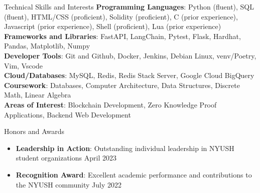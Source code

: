 \documentclass{resume} %
\begin{document}
\begin{rSection}{Technical Skills and Interests}
	\textbf{Programming Languages}{: Python (fluent), SQL (fluent), HTML/CSS (proficient), Solidity (proficient), C (prior experience),  Javascript (prior experience), Shell  (proficient), Lua (prior experience)} \\
	\textbf{Frameworks and Libraries}{: FastAPI, LangChain, Pytest, Flask, Hardhat, Pandas, Matplotlib, Numpy} \\
	\textbf{Developer Tools}{: Git and Github, Docker, Jenkins, Debian Linux, venv/Poetry, Vim, Vscode} \\
	\textbf{Cloud/Databases}{: MySQL, Redis, Redis Stack Server, Google Cloud BigQuery} \\
	\textbf{Coursework}{: Databases, Computer Architecture, Data Structures, Discrete Math, Linear Algebra} \\
	\textbf{Areas of Interest}{: Blockchain Development, Zero Knowledge Proof Applications, Backend Web Development}
\end{rSection}

\begin{rSection}{Honors and Awards}
	\begin{itemize}
		\item \textbf{Leadership in Action}{: Outstanding individual leadership in NYUSH student organizations} \hfill April 2023
		\item \textbf{Recognition Award}{: Excellent academic performance and contributions to the NYUSH community} \hfill July 2022
	\end{itemize}
\end{rSection}
\end{document}
